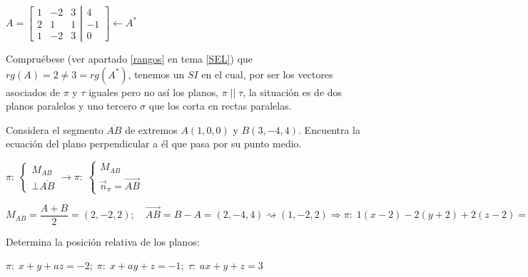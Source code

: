 \begin{proofw}\renewcommand{\qedsymbol}{$\diamond$}
$A=\left[ \begin{matrix} 1&-2&3\\2&1&1\\1&-2&3 \end{matrix} \right. \left| \begin{matrix} 4\\-1\\0 \end{matrix} \right] \leftarrow A^*$

Compruébese (ver apartado \ref{rangos} en tema \ref{SEL}) que $rg(A)=2\neq 3=rg(A^*)$, tenemos un $SI$ en el cual, por ser los vectores asociados de $\pi$ y $\tau$ iguales pero no así los planos, $\pi\;||\;\tau$, la situación es de dos planos paralelos y uno tercero $\sigma$ que los corta en rectas paralelas.
	
\end{proofw}




\begin{ejre}
	Considera el segmento $\overline{AB}$ de extremos $A(1,0,0)$ y $B(3,-4,4)$. Encuentra la ecuación del plano perpendicular a él que pasa por su punto medio.
\end{ejre}

\begin{proofw}\renewcommand{\qedsymbol}{$\diamond$}
	$\pi:\; \begin{cases} M_{AB} \\ \bot \overline{AB} \end{cases} \to \pi:\; \begin{cases} M_{AB} \\ \vec n_{\pi}=\overrightarrow{AB} \end{cases}$

\noindent $M_{AB}=\dfrac{A+B}{2}=(2, -2, 2);\quad \overrightarrow{AB}=B-A=(2,-4,4)\rightsquigarrow (1,-2,2) \Rightarrow \pi:\; 1(x-2)-2(y+2)+2(z-2)=0 \to \pi:\;x-2y+2z-2=0$

\end{proofw}




\begin{ejre}
	Determina la posición relativa de los planos:
	
	$\pi:\; x+y+az=-2;\; \pi:\; x+ay+z=-1;\; \tau:\;ax+y+z=3$ 
\end{ejre}

